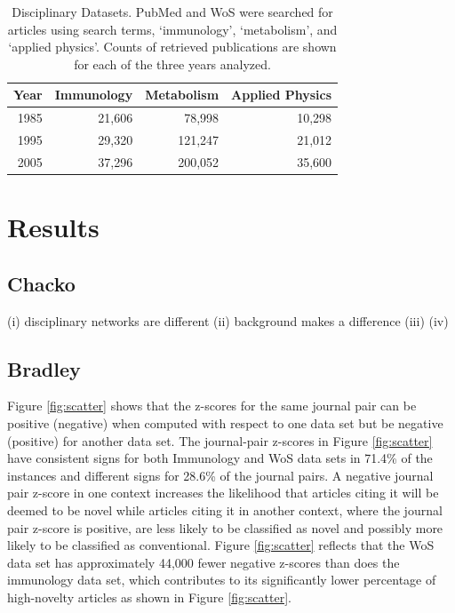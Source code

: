 \documentclass[NETN]{stjour}
\begin{document}
 


\begin{table}[ht]
\caption{Disciplinary Datasets. PubMed and WoS were searched for articles using search terms, `immunology', `metabolism', and `applied physics'. Counts of retrieved publications are shown for each of the three years analyzed.}
\label{tab:label}
\centering
\begin{tabular}{|r r r r|}
  \hline
Year & Immunology & Metabolism & Applied Physics \\ 
  \hline
1985 & 21,606 & 78,998 & 10,298 \\ 
1995 & 29,320 & 121,247 & 21,012  \\ 
2005 & 37,296 & 200,052 & 35,600  \\ 
 \hline
\end{tabular}
\end{table}


\section{Results}
\subsection{Chacko}
(i) disciplinary networks are different
(ii) background makes a difference
(iii) 
(iv) 

\subsection{Bradley}
Figure \ref{fig:scatter} shows that the z-scores for the same journal pair can be positive (negative) when computed with respect to one data set but be negative (positive) for another data set. The journal-pair z-scores in Figure \ref{fig:scatter} have consistent signs for both Immunology and WoS data sets in 71.4\% of the instances and different signs for 28.6\% of the journal pairs. A negative journal pair z-score in one context increases the likelihood that articles citing it will be deemed to be novel while articles citing it in another context, where the journal pair z-score is positive, are less likely to be classified as novel and possibly more likely to be classified as conventional. Figure \ref{fig:scatter} reflects that the WoS data set has approximately 44,000 fewer negative z-scores than does the immunology data set, which contributes to its significantly lower percentage of high-novelty articles as shown in Figure \ref{fig:scatter}.
\end{document}
